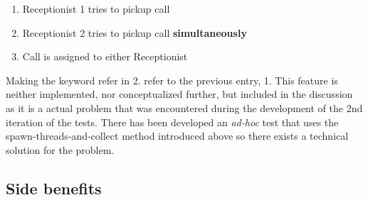 \begin{enumerate}
 \item Receptionist 1 tries to pickup call
 \item Receptionist 2 tries to pickup call \textbf{simultaneously}
 \item Call is assigned to either Receptionist
\end{enumerate}
Making the keyword refer in 2. refer to the previous entry, 1. This feature is neither implemented, nor conceptualized further, but included in the discussion as it is a actual problem that was encountered during the development of the 2nd iteration of the tests. There has been developed an \emph{ad-hoc} test that uses the spawn-threads-and-collect method introduced above so there exists a technical solution for the problem.


\subsection{Side benefits}


